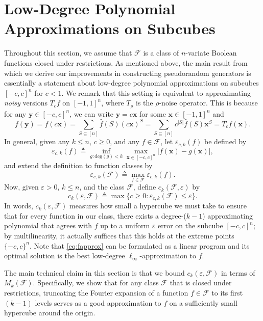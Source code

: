 \documentclass[10pt,a4paper]{article}
\newcommand{\eps}{\varepsilon}
\theoremstyle{definition}
\begin{document}
\setcounter{theorem}{16}\section{Low-Degree Polynomial Approximations on Subcubes}
\label{sec:lowdeg}

Throughout this section, we assume that $\mathcal{F}$ is a class of $n$-variate Boolean functions closed under restrictions.  As mentioned above, the main result from which we derive our improvements in constructing pseudorandom generators is essentially a statement about low-degree polynomial approximations on subcubes $[-c,c]^n$ for $c<1$.   We remark that this setting is equivalent to approximating \emph{noisy} versions $T_cf$ on $[-1,1]^n$, where $T_{\rho}$ is the $\rho$-noise operator.  This is because for any $\mathbf{y} \in [-c,c]^n$, we can write $\mathbf{y} = c\mathbf{x}$ for some $\mathbf{x} \in [-1,1]^n$ and
\[
f(\mathbf{y})
=f(c\mathbf{x})
= \sum_{S \subseteq [n]} \hat{f}(S) (c\mathbf{x})^S
= \sum_{S \subseteq [n]} c^{|S|} \hat{f}(S) \mathbf{x}^S
= T_cf(\mathbf{x}) .
\]
In general, given any $k\leq n$, $c\geq 0$, and any $f\in \mathcal{F}$, let $\eps_{c,k}(f)$ be defined by
\begin{equation}
\label{eq:fapprox}
    \eps_{c,k}(f) \triangleq \inf_{g: \mathrm{deg}(g)< k}\max_{\mathbf{x}\in [-c,c]^n}  \vert f(\mathbf{x})-g(\mathbf{x})\vert,
\end{equation}
and extend the definition to function classes by
\begin{equation*}
    \eps_{c,k}(\mathcal{F}) \triangleq \max_{f\in \mathcal{F}} \eps_{c,k}(f).
\end{equation*}
Now, given $\eps>0$, $k\leq n$, and the class $\mathcal{F}$, define $c_k(\mathcal{F},\eps)$ by
\begin{equation*}
    c_k(\eps,\mathcal{F})\triangleq \max\{ c\geq 0: \eps_{c,k}(\mathcal{F})\leq \eps\}.
\end{equation*}
In words, $c_k(\eps,\mathcal{F})$ measures how small a hypercube we must take to ensure that for every function in our class, there exists a degree-($k-1$) approximating polynomial that agrees with $f$ up to a uniform $\eps$ error on the subcube $[-c,c]^n$; by multilinearity, it actually suffices that this holds at the extreme points $\{-c,c\}^n$. Note that \cref{eq:fapprox} can be formulated as a linear program and its optimal solution is the best low-degree  $\ell_{\infty}$-approximation to $f$.


The main technical claim in this section is that we bound $c_k \left( \eps , \mathcal{F} \right)$ in terms of $M_k(\mathcal{F})$.  Specifically, we show that for any class $\mathcal{F}$ that is closed under restrictions, truncating the Fourier expansion of a function $f \in \mathcal{F}$ to its first $(k-1)$ levels serves as a good approximation to $f$ on a sufficiently small hypercube around the origin.
\end{document}
